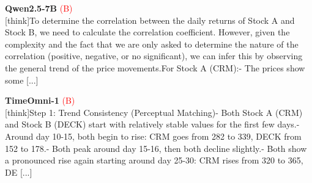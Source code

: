 \noindent
\begin{minipage}[t]{0.28\textwidth}
\colorbox{red!8}{\parbox{\dimexpr\textwidth-2\fboxsep}{
\textbf{Qwen2.5-7B} \textcolor{red}{(B)} \\[2pt]
\tiny
[think]To determine the correlation between the daily returns of Stock A and Stock B, we need to calculate the correlation coefficient. However, given the complexity and the fact that we are only asked to determine the nature of the correlation (positive, negative, or no significant), we can infer this by observing the general trend of the price movements.\newline For Stock A (CRM):\newline - The prices show some [...]
}}
\end{minipage}
\hfill
\begin{minipage}[t]{0.28\textwidth}
\colorbox{red!8}{\parbox{\dimexpr\textwidth-2\fboxsep}{
\textbf{TimeOmni-1} \textcolor{red}{(B)} \\[2pt]
\tiny
[think]\newline Step 1: Trend Consistency (Perceptual Matching)\newline - Both Stock A (CRM) and Stock B (DECK) start with relatively stable values for the first few days.\newline - Around day 10-15, both begin to rise: CRM goes from  282 to  339, DECK from  152 to  178.\newline - Both peak around day 15-16, then both decline slightly.\newline - Both show a pronounced rise again starting around day 25-30: CRM rises from  320 to  365, DE [...]
}}
\end{minipage}
\hfill
